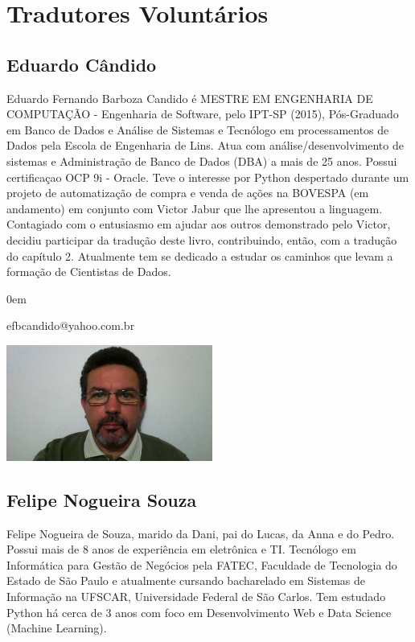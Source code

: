 
\chapter{Tradutores Voluntários}


\section*{Eduardo Cândido}

Eduardo Fernando Barboza Candido é MESTRE EM ENGENHARIA DE COMPUTAÇÃO - Engenharia de Software, pelo IPT-SP (2015), Pós-Graduado em Banco de Dados e Análise de Sistemas e Tecnólogo em processamentos de Dados pela Escola de Engenharia de Lins. Atua com análise/desenvolvimento de sistemas e Administração de Banco de Dados (DBA) a mais de 25 anos. Possui certificaçao OCP 9i - Oracle. Teve o interesse por Python despertado durante um projeto de automatização de compra e venda de ações na BOVESPA (em andamento) em conjunto com Victor Jabur que lhe apresentou a linguagem. Contagiado com o entusiasmo em ajudar aos outros demonstrado pelo Victor, decidiu participar da tradução deste livro, contribuindo, então, com a tradução do capítulo 2. Atualmente tem se dedicado a estudar os caminhos que levam a formação de Cientistas de Dados.

\begin{description}
\itemsep0em 
\item[E-mail] efbcandido@yahoo.com.br
\end{description}

\beforefig
\centerline{\includegraphics[height=1.50in]{translators/eduardobarboza.eps}}
\afterfig

\newpage

\section*{Felipe Nogueira Souza}

Felipe Nogueira de Souza, marido da Dani, pai do Lucas, da Anna e do Pedro. Possui mais de 8 anos de experiência em eletrônica e TI. Tecnólogo em Informática para Gestão de Negócios pela FATEC, Faculdade de Tecnologia do Estado de São Paulo e atualmente cursando bacharelado em Sistemas de Informação na UFSCAR, Universidade Federal de São Carlos. Tem estudado Python há cerca de 3 anos com foco em Desenvolvimento Web e Data Science (Machine Learning).

